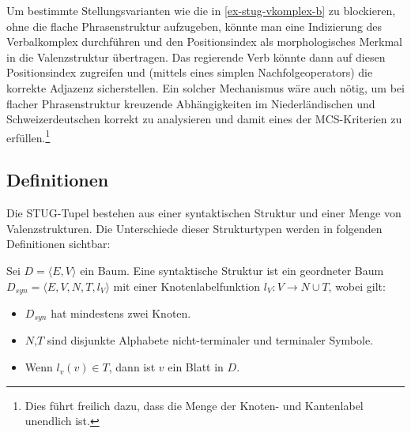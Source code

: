 Um bestimmte Stellungsvarianten wie die in \ref{ex-stug-vkomplex-b} zu blockieren, ohne die flache Phrasenstruktur aufzugeben, könnte man eine Indizierung des Verbalkomplex durchführen und den Positionsindex als morphologisches Merkmal in die Valenzstruktur übertragen. Das regierende Verb könnte dann auf diesen Positionsindex zugreifen und (mittels eines simplen Nachfolgeoperators) die korrekte Adjazenz sicherstellen. Ein solcher Mechanismus wäre auch nötig, um bei flacher Phrasenstruktur kreuzende Abhängigkeiten im Niederländischen und Schweizerdeutschen korrekt zu analysieren und damit eines der MCS-Kriterien zu erfüllen.\footnote{Dies führt freilich dazu, dass die Menge der Knoten- und Kantenlabel unendlich ist.}


\subsection{Definitionen}

Die STUG-Tupel bestehen aus einer syntaktischen Struktur und einer Menge von Valenzstrukturen. Die Unterschiede dieser Strukturtypen werden in folgenden Definitionen sichtbar:

\begin{definition} Sei $D = \langle E,V \rangle$ ein Baum. Eine syntaktische Struktur ist ein geordneter Baum $D_{syn} = \langle E,V,N,T,l_V \rangle$ mit einer Knotenlabelfunktion $l_V: V \to N\cup T$, wobei gilt:
\begin{itemize}
  \item $D_{syn}$ hat mindestens zwei Knoten.
  \item $N$,$T$ sind disjunkte Alphabete nicht-terminaler und terminaler Symbole.
  \item Wenn $l_v(v) \in T$, dann ist $v$ ein Blatt in $D$.
\end{itemize} 
\end{definition}

